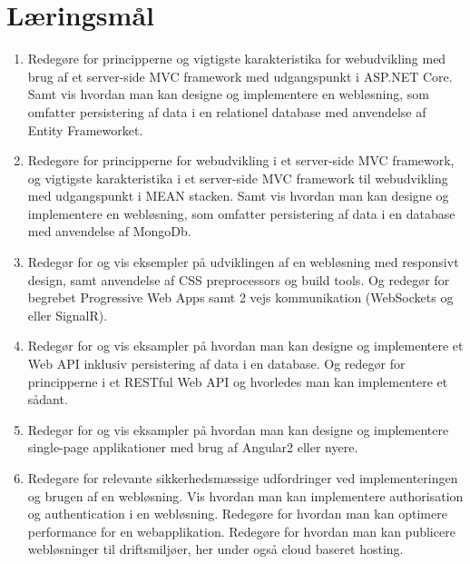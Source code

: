 \section*{Læringsmål}

\begin{enumerate}
	
	\item 
	Redegøre for principperne og vigtigste karakteristika for webudvikling med brug af et server-side MVC framework med udgangspunkt i ASP.NET Core. Samt vis hvordan man kan designe og implementere en	webløsning, som omfatter persistering af data i en relationel database med anvendelse af Entity Frameworket.
	
	\item 
	Redegøre for principperne for webudvikling i et server-side MVC framework, og vigtigste karakteristika i et server-side	MVC framework til webudvikling med udgangspunkt i MEAN stacken. Samt vis hvordan man kan designe og implementere en	webløsning, som omfatter persistering af data i en database	med anvendelse af MongoDb.
	
	\item 
	Redegør for og vis eksempler på udviklingen af en webløsning med responsivt design, samt anvendelse af CSS preprocessors og build tools. Og redegør for begrebet Progressive Web Apps samt 2 vejs	kommunikation (WebSockets og eller SignalR).
	
	\item 
	Redegør for og vis eksampler på hvordan man kan designe	og implementere et Web API inklusiv persistering af data i en database. Og redegør for principperne i et RESTful Web API og	hvorledes man kan implementere et sådant.
		
	\item
	Redegør for og vis eksampler på hvordan man kan designe	og implementere single-page applikationer med brug af	Angular2 eller nyere.
	
	\item 
	Redegøre for relevante sikkerhedsmæssige udfordringer ved implementeringen og brugen af en webløsning. Vis hvordan man kan implementere authorisation og authentication i en webløsning.	Redegøre for hvordan man kan optimere performance for en webapplikation. Redegøre for hvordan man kan publicere webløsninger til driftsmiljøer, her under også cloud baseret hosting.
	
\end{enumerate}